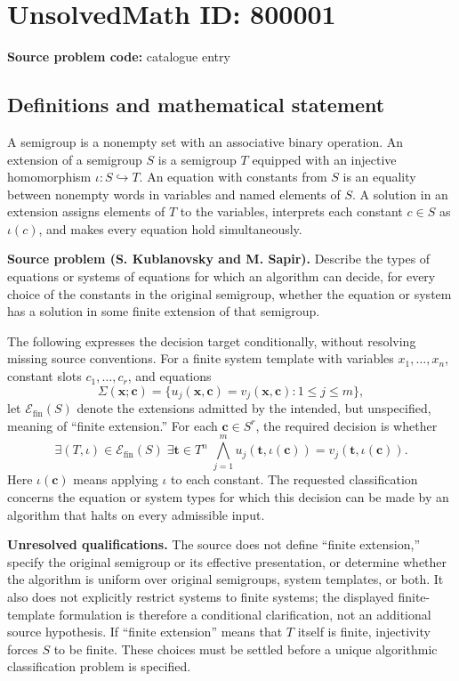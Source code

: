 \documentclass[11pt]{article}
\begin{document}
\section*{UnsolvedMath ID: 800001}
\textbf{Source problem code:} catalogue entry
\subsection{Definitions and mathematical statement}
A semigroup is a nonempty set with an associative binary operation. An extension of a semigroup \(S\) is a semigroup \(T\) equipped with an injective homomorphism \(\iota:S\hookrightarrow T\). An equation with constants from \(S\) is an equality between nonempty words in variables and named elements of \(S\). A solution in an extension assigns elements of \(T\) to the variables, interprets each constant \(c\in S\) as \(\iota(c)\), and makes every equation hold simultaneously.

\textbf{Source problem (S. Kublanovsky and M. Sapir).} Describe the types of equations or systems of equations for which an algorithm can decide, for every choice of the constants in the original semigroup, whether the equation or system has a solution in some finite extension of that semigroup.

The following expresses the decision target conditionally, without resolving missing source conventions. For a finite system template with variables \(x_1,\ldots,x_n\), constant slots \(c_1,\ldots,c_r\), and equations
\[
\Sigma(\mathbf x;\mathbf c)=\{u_j(\mathbf x,\mathbf c)=v_j(\mathbf x,\mathbf c):1\leq j\leq m\},
\]
let \(\mathcal E_{\mathrm{fin}}(S)\) denote the extensions admitted by the intended, but unspecified, meaning of ``finite extension.'' For each \(\mathbf c\in S^r\), the required decision is whether
\[
\exists (T,\iota)\in\mathcal E_{\mathrm{fin}}(S)\;\exists\mathbf t\in T^n\;\bigwedge_{j=1}^{m}
 u_j(\mathbf t,\iota(\mathbf c))=v_j(\mathbf t,\iota(\mathbf c)).
\]
Here \(\iota(\mathbf c)\) means applying \(\iota\) to each constant. The requested classification concerns the equation or system types for which this decision can be made by an algorithm that halts on every admissible input.

\textbf{Unresolved qualifications.} The source does not define ``finite extension,'' specify the original semigroup or its effective presentation, or determine whether the algorithm is uniform over original semigroups, system templates, or both. It also does not explicitly restrict systems to finite systems; the displayed finite-template formulation is therefore a conditional clarification, not an additional source hypothesis. If ``finite extension'' means that \(T\) itself is finite, injectivity forces \(S\) to be finite. These choices must be settled before a unique algorithmic classification problem is specified.
\end{document}
